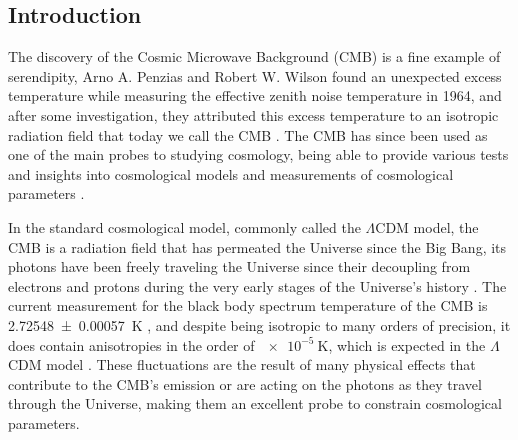 \documentclass[openany,a4paper,12pt,oneside]{book}
\begin{document}
\listoffigures


\listoftables

\tableofcontents

\cleardoublepage
{}

\begingroup
{}
\begin{spacing}{1.5}
\setlength{\abovedisplayskip}{0.01cm}
\setlength{\abovedisplayshortskip}{0.01cm}

\chapter{Introduction}

The discovery of the Cosmic Microwave Background (CMB) is a fine example of serendipity, Arno A. Penzias and Robert W. Wilson found an unexpected excess temperature while measuring the effective zenith noise temperature in 1964, and after some investigation, they attributed this excess temperature to an isotropic radiation field that today we call the CMB \cite{1965CMB_discovery}. The CMB has since been used as one of the main probes to studying cosmology, being able to provide various tests and insights into cosmological models \cite{Large_scale_anomalies, nongaussianity_inflation, rees_sciama_effect} and measurements of cosmological parameters \cite{WMAP_results, Planck_results}. 

In the standard cosmological model, commonly called the $\Lambda$CDM model, the CMB is a radiation field that has permeated the Universe since the Big Bang, its photons have been freely traveling the Universe since their decoupling from electrons and protons during the very early stages of the Universe's history \cite{CMB_physical_explanation}. The current measurement for the black body spectrum temperature of the CMB is \SI{2.72548 \pm 0.00057}{\kelvin} \cite{CMB_temperature:Fixsen_2009}, and despite being isotropic to many orders of precision, it does contain anisotropies in the order of $\SI{e-5}{\kelvin}$, which is expected in the $\Lambda$CDM model \cite{CMB_analytical_anisotropies}. These fluctuations are the result of many physical effects that contribute to the CMB's emission or are acting on the photons as they travel through the Universe, making them an excellent probe to constrain cosmological parameters.


\end{spacing}
\end{document}
